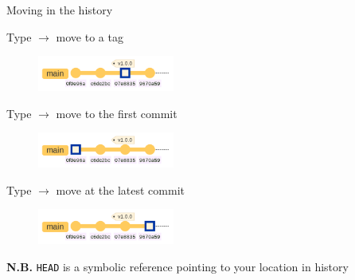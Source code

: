 \documentclass[10pt]{beamer}
\begin{document}
\begin{frame}[fragile]{Moving in the history}
\protect\hypertarget{moving-in-the-history}{}

Type  \(\rightarrow\) move to a tag

\begin{figure}[H]

{\centering \includegraphics[width=0.4\textwidth]{mermaid/mermaid-figure-19.png}

}

\end{figure}

Type  \(\rightarrow\) move to the first
commit

\begin{figure}[H]

{\centering \includegraphics[width=0.4\textwidth]{mermaid/mermaid-figure-18.png}

}

\end{figure}

Type  \(\rightarrow\) move at the latest
commit

\begin{figure}[H]

{\centering \includegraphics[width=0.4\textwidth]{mermaid/mermaid-figure-17.png}

}

\end{figure}

\textbf{N.B.} \texttt{HEAD} is a symbolic reference pointing to your location in history

\end{frame}
\end{document}
